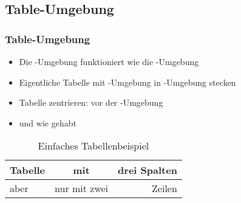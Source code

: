 \subsection{Table-Umgebung}
\begin{frame}[fragile]
\frametitle{Table-Umgebung}
\begin{itemize}
    \item Die -Umgebung funktioniert wie die -Umgebung\pause
    \item Eigentliche Tabelle mit -Umgebung in -Umgebung
        stecken\pause
    \item Tabelle zentrieren:  vor der -Umgebung\pause
    \item {} und  wie gehabt
\end{itemize}


\pause
\bigskip

  \begin{table}
      \begin{tabular}{|l|c|r|}
	\hline
	Tabelle & mit & drei Spalten \\\hline
	aber & nur mit zwei & Zeilen \\\hline
      \end{tabular}
      \caption{Einfaches Tabellenbeispiel}
    \end{table}
\end{frame}
